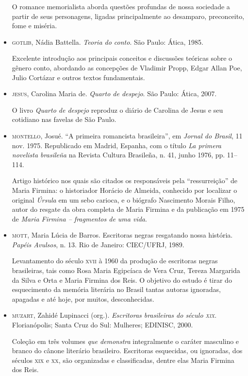 \documentclass[12pt]{extarticle}
\begin{document}
\begin{itemize}
O romance memorialista aborda questões profundas de nossa 
sociedade a partir de seus personagens, ligadas principalmente ao 
desamparo, preconceito, fome e miséria.

\item\textsc{gotlib}, Nádia Battella. \emph{Teoria do conto}. São Paulo: Ática, 1985.

Excelente introdução aos principais conceitos e discussões teóricas
sobre o gênero conto, abordando as concepções de Vladimir Propp, Edgar
Allan Poe, Julio Cortázar e outros textos fundamentais.

\item\textsc{jesus}, Carolina Maria de. \textit{Quarto de despejo}. São Paulo:
  Ática, 2007.

O livro \textit{Quarto de despejo} reproduz o diário de Carolina de Jesus e 
seu cotidiano nas favelas de São Paulo.

\item\textsc{montello}, Josué. ``A primeira romancista brasileira'', em \emph{Jornal do
Brasil}, 11 nov. 1975. Republicado em Madrid, Espanha, com o título
\emph{La primera novelista brasileña} na Revista Cultura Brasileña,
n. 41, junho 1976, pp. 11--114. 

Artigo histórico nos quais são citados os
responsáveis pela ``ressurreição'' de Maria Firmina: o historiador
Horácio de Almeida, conhecido por localizar o original \emph{Úrsula} em
um sebo carioca, e o biógrafo Nascimento Morais Filho, autor do resgate
da obra completa de Maria Firmina e da publicação em 1975 de \emph{Maria
Firmina -- fragmentos de uma vida}.

\item\textsc{mott}, Maria Lúcia de Barros. Escritoras negras resgatando nossa
história. \emph{Papéis Avulsos}, n. 13. Rio de Janeiro: CIEC/UFRJ, 1989.

Levantamento do século \textsc{xvii} à 1960 da produção de escritoras negras
brasileiras, tais como Rosa Maria Egipcíaca de Vera Cruz, Tereza
Margarida da Silva e Orta e Maria Firmina dos Reis. O objetivo do estudo
é tirar do esquecimento da memória literária no Brasil tantas autoras
ignoradas, apagadas e até hoje, por muitos, desconhecidas.

\item\textsc{muzart}, Zahidé Lupinacci (org.). \emph{Escritoras brasileiras do século
\textsc{xix}}. Florianópolis; Santa Cruz do Sul: Mulheres; EDINISC, 2000.

Coleção em três volumes \emph{que demonstra} integralmente o caráter
masculino e branco do cânone literário brasileiro. Escritoras
esquecidas, ou ignoradas, dos séculos \textsc{xix} e \textsc{xx}, são organizadas e
classificadas, dentre elas Maria Firmina dos Reis.


\end{itemize}
\end{document}
